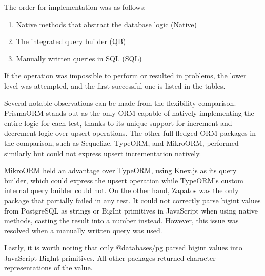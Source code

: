 The order for implementation was as follows:
\begin{enumerate}
  \item Native methods that abstract the database logic (Native)
  \item The integrated query builder (QB)
  \item Manually written queries in SQL (SQL)
\end{enumerate}
If the operation was impossible to perform or resulted in problems, the lower
level was attempted, and the first successful one is listed in the tables.

Several notable observations can be made from the flexibility comparison.
PrismaORM stands out as the only ORM capable of natively implementing the entire
logic for each test, thanks to its unique support for increment and decrement
logic over upsert operations. The other full-fledged ORM packages in the
comparison, such as Sequelize, TypeORM, and MikroORM, performed similarly but
could not express upsert incrementation natively.

MikroORM held an advantage over TypeORM, using Knex.js as its query builder,
which could express the upsert operation while TypeORM's custom internal query
builder could not. On the other hand, Zapatos was the only package that
partially failed in any test. It could not correctly parse bigint values from
PostgreSQL as strings or BigInt primitives in JavaScript when using native
methods, casting the result into a number instead. However, this issue was
resolved when a manually written query was used.

Lastly, it is worth noting that only @databases/pg parsed bigint values into
JavaScript BigInt primitives. All other packages returned character
representations of the value. 


